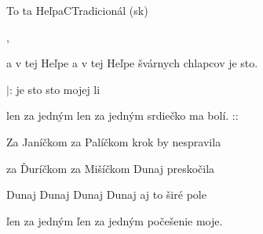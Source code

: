 \begin{song}{To ta Heľpa}{C}{Tradicionál (sk)}

\begin{SBVerse}

      ,

a v tej Heľpe a v tej Heľpe švárnych chlapcov je sto.

$|$:  je sto  sto  mojej li

len za jedným len za jedným srdiečko ma bolí. :$:$

\end{SBVerse}

\begin{SBVerse}

Za Janíčkom za Palíčkom krok by nespravila

za Ďuríčkom za Mišíčkom Dunaj preskočila

Dunaj Dunaj Dunaj Dunaj aj to širé pole

ľen za jedným ľen za jedným počešenie moje.

\end{SBVerse}

\end{song}

\clearpage
